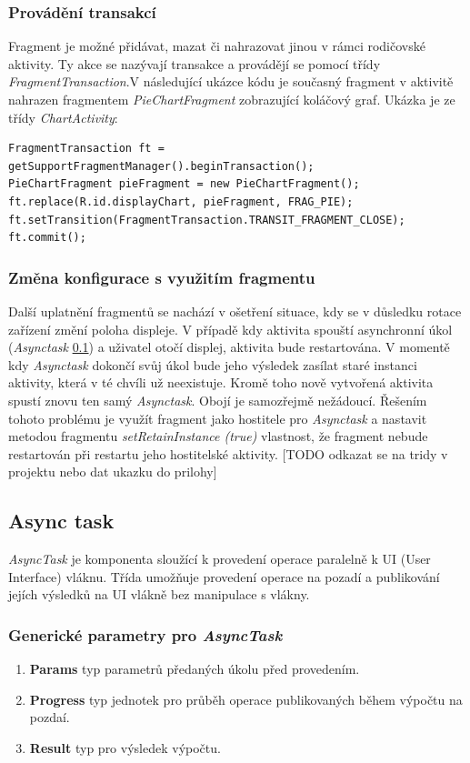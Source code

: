 \documentclass{diplomka}
\begin{document}
\subsubsection*{Provádění transakcí}
Fragment je možné přidávat, mazat či nahrazovat jinou v rámci rodičovské aktivity. Ty akce se nazývají transakce a provádějí se pomocí třídy \emph{FragmentTransaction}.V následující ukázce kódu je současný fragment v aktivitě nahrazen fragmentem \emph{PieChartFragment} zobrazující koláčový graf. Ukázka je ze třídy \emph{ChartActivity}:

\begin{lstlisting}
FragmentTransaction ft = getSupportFragmentManager().beginTransaction();
PieChartFragment pieFragment = new PieChartFragment();
ft.replace(R.id.displayChart, pieFragment, FRAG_PIE);
ft.setTransition(FragmentTransaction.TRANSIT_FRAGMENT_CLOSE);
ft.commit();
\end{lstlisting}

\subsubsection*{Změna konfigurace s využitím fragmentu}
Další uplatnění fragmentů se nachází v ošetření situace, kdy se v důsledku rotace zařízení změní poloha displeje. V případě kdy aktivita spouští asynchronní úkol (\emph{Asynctask} \ref{sec:asynctask}) a uživatel otočí displej, aktivita bude restartována. V momentě kdy \emph{Asynctask} dokončí svůj úkol bude jeho výsledek zasílat staré instanci aktivity, která v té chvíli už neexistuje. Kromě toho nově vytvořená aktivita spustí znovu ten samý \emph{Asynctask}. Obojí je samozřejmě nežádoucí. Řešením tohoto problému je využít fragment jako hostitele pro \emph{Asynctask} a nastavit metodou fragmentu \emph{setRetainInstance (true)} vlastnost, že fragment nebude restartován při restartu jeho hostitelské aktivity\cite{config}. 
[TODO odkazat se na tridy v projektu nebo dat ukazku do prilohy]

\subsection{Async task}
\label{sec:asynctask}
\emph{AsyncTask} je komponenta sloužící k provedení operace paralelně k UI (User Interface) vláknu. Třída umožňuje provedení operace na pozadí a publikování jejích výsledků na UI vlákně bez manipulace s vlákny. 
\subsubsection*{Generické parametry pro \emph{AsyncTask}}
\begin{enumerate}
\item \textbf{Params} typ parametrů předaných úkolu před provedením.
\item \textbf{Progress} typ jednotek pro průběh operace publikovaných během výpočtu na pozdaí.
\item \textbf{Result} typ pro výsledek výpočtu. 
\end{enumerate}
\end{document}

